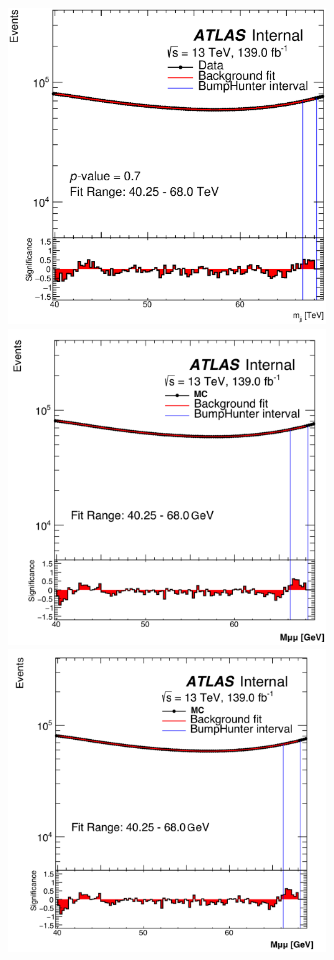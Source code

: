 \begin{figure}[!htb]
    \begin{center}
        \includegraphics[width=0.75\textwidth]{figures/chapter_dimuon/nominal}        
        \includegraphics[width=0.75\textwidth]{figures/chapter_dimuon/up}        
        \includegraphics[width=0.75\textwidth]{figures/chapter_dimuon/down}        

\end{center}
\end{figure}
